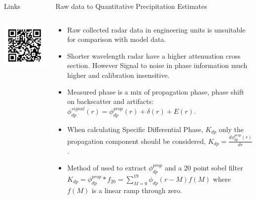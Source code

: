 \documentclass[final]{beamer}
\begin{document}
\begin{frame}{}
\begin{columns}[t]
\begin{column}{.3\linewidth}
\begin{block}{Links}
\begin{columns}[c]
\begin{column}{.2\linewidth}
		 		\includegraphics[width=.9\linewidth]{figures/git_repo_qr}\\[1ex]   
        		 	\end{column}
         	\end{columns}
         \end{block}

  		

    \end{column}
      \begin{column}{.3\linewidth}
  \vfill
 
     \begin{block}{Raw data to Quantitative Precipitation Estimates}
 	\begin{columns}[t]
		\begin{column}{.4\linewidth}
		\begin{itemize}
		\item Raw collected radar data in engineering units is unsuitable for comparison with model data. 
		\item Shorter wavelength radar have a higher attenuation cross section. However Signal to noise in phase information much higher and calibration insensitive.
		\item Measured phase is a mix of propagation phase, phase shift on backscatter and artifacts: {\tiny $\phi_{dp}^{signal}(r) = \phi_{dp}^{prop}(r) + \delta(r) + E(r)$}.
		\item When calculating Specific Differential Phase, {\small $K_{dp}$} only the propagation component should be considered, {\tiny $K_{dp} = \frac{d\phi_{dp}^{prop}(r)}{dr}$}.
		\item Method of \citet{giangrande_application_2013} used to extract {\small $\phi_{dp}^{prop}$} and a 20 point sobel filter 
		{\tiny$K_{dp} = \phi_{dp}^{prop} \ast f_{20} = \sum\limits_{M=0}^{19}   \phi_{dp}(r-M)f(M)$} where $f(M)$ is a linear ramp through zero. 
		

\end{itemize}
\end{column}
\end{columns}
\end{block}
\end{column}
\end{columns}
\end{frame}
\end{document}
